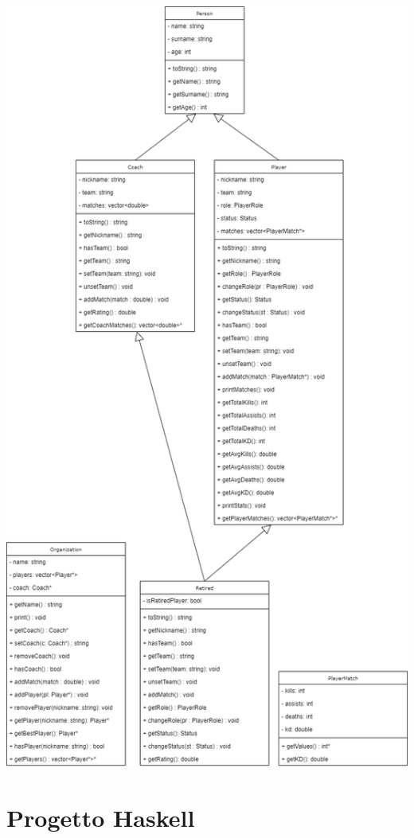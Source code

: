 \documentclass[a4paper, 11pt]{article}
\begin{document}
\begin{center}
\includegraphics[height=\textheight]{uml}
\end{center}


\section{Progetto Haskell}
\end{document}
